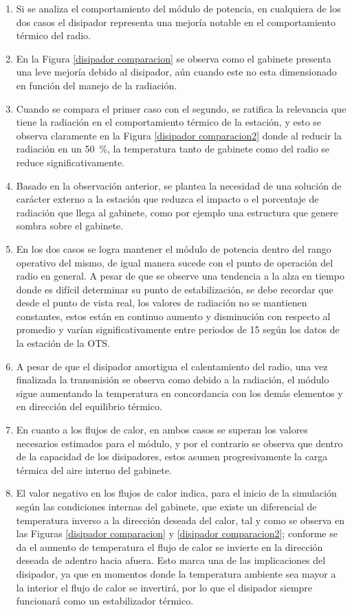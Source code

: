 \begin{enumerate}
    \item Si se analiza el comportamiento del módulo de potencia, en cualquiera de los dos casos el disipador representa una mejoría notable en el comportamiento térmico del radio.
    \item En la Figura \ref{disipador comparacion} se observa como el gabinete presenta una leve mejoría debido al disipador, aún cuando este no esta dimensionado en función del manejo de la radiación.
    \item Cuando se compara el primer caso con el segundo, se ratifica la relevancia que tiene la radiación en el comportamiento térmico de la estación, y esto se observa claramente en la Figura \ref{disipador comparacion2} donde al reducir la radiación en un \SI{50}{\percent}, la temperatura tanto de gabinete como del radio se reduce significativamente.
    \item Basado en la observación anterior, se plantea la necesidad de una solución de carácter externo a la estación que reduzca el impacto o el porcentaje de radiación que llega al gabinete, como por ejemplo una estructura que genere sombra sobre el gabinete.
    \item En los dos casos se logra mantener el módulo de potencia dentro del rango operativo del mismo, de igual manera sucede con el punto de operación del radio en general. A pesar de que se observe  una tendencia a la alza en tiempo donde es difícil determinar su punto de estabilización, se debe recordar que desde el punto de vista real, los valores de radiación no se mantienen constantes, estos están en continuo aumento y disminución con respecto al promedio y varían significativamente entre periodos de \SI{15}{\min} según los datos de la estación de la OTS.
    \item A pesar de que el disipador amortigua el calentamiento del radio, una vez finalizada la transmisión se observa como debido a la radiación, el módulo sigue aumentando la temperatura en concordancia con los demás elementos y en dirección del equilibrio térmico.
    \item En cuanto a los flujos de calor, en ambos casos se superan los valores necesarios estimados para el módulo, y por el contrario se observa que dentro de la capacidad de los disipadores, estos asumen progresivamente la carga térmica del aire interno del gabinete.
    \item El valor negativo en los flujos de calor indica, para el inicio de la simulación según las condiciones internas del gabinete, que existe un diferencial de temperatura inverso a la dirección deseada del calor, tal y como se observa en las Figuras \ref{disipador comparacion} y \ref{disipador comparacion2}; conforme se da el aumento de temperatura el flujo de calor se invierte en la dirección deseada de adentro hacia afuera. Esto marca una de las implicaciones del disipador, ya que en momentos donde la temperatura ambiente sea mayor a la interior el flujo de calor se invertirá, por lo que el disipador siempre funcionará como un estabilizador térmico.
\end{enumerate}

